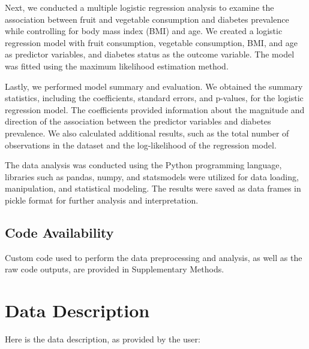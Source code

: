 \documentclass[11pt]{article}
\begin{document}
Next, we conducted a multiple logistic regression analysis to examine the association between fruit and vegetable consumption and diabetes prevalence while controlling for body mass index (BMI) and age. We created a logistic regression model with fruit consumption, vegetable consumption, BMI, and age as predictor variables, and diabetes status as the outcome variable. The model was fitted using the maximum likelihood estimation method.

Lastly, we performed model summary and evaluation. We obtained the summary statistics, including the coefficients, standard errors, and p-values, for the logistic regression model. The coefficients provided information about the magnitude and direction of the association between the predictor variables and diabetes prevalence. We also calculated additional results, such as the total number of observations in the dataset and the log-likelihood of the regression model.

The data analysis was conducted using the Python programming language, libraries such as pandas, numpy, and statsmodels were utilized for data loading, manipulation, and statistical modeling. The results were saved as data frames in pickle format for further analysis and interpretation.\subsection*{Code Availability}

Custom code used to perform the data preprocessing and analysis, as well as the raw code outputs, are provided in Supplementary Methods.


\clearpage
\appendix

\section{Data Description} \label{sec:data_description} Here is the data description, as provided by the user:
\end{document}
